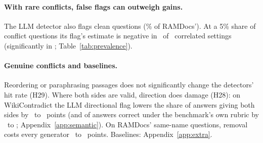 \paragraph{With rare conflicts, false flags can outweigh gains.} The LLM detector also flags clean questions
(\cleanFprLlm\% of RAMDocs'). At a 5\% share of conflict questions its flag's estimate is negative in \prevNegFive\ of \prevN\ correlated settings
(significantly in \prevSigNeg; Table~\ref{tab:prevalence}).

\paragraph{Genuine conflicts and baselines.} Reordering \citep{liu2024lost} or paraphrasing passages does not significantly
change the detectors' hit rate (H29). Where both sides are valid, direction does damage (H28): on WikiContradict the LLM directional
flag lowers the share of answers giving both sides by \ahTwentyEightWcMiniDir\ to \ahTwentyEightWcLunaDir\ points
(and of answers correct under the benchmark's own rubric by \awikiOrigMiniEffPt\ to \awikiOrigLunaEffPt;
Appendix~\ref{app:semantic}). On RAMDocs' same-name questions, removal costs every generator
\ahTwentyEightAmbMiniRem\ to \ahTwentyEightAmbLunaRem\ points. Baselines: Appendix~\ref{app:extra}.
